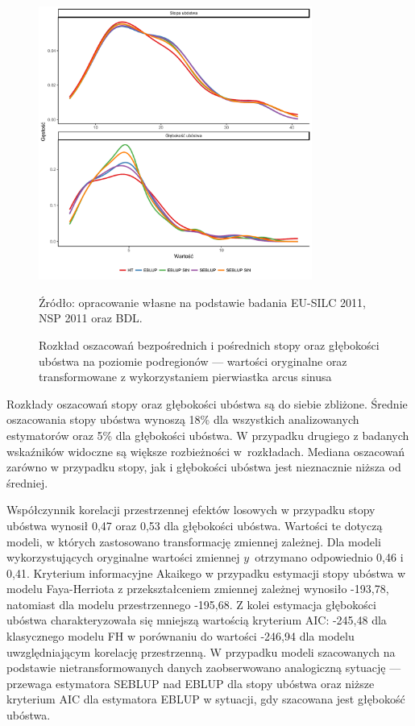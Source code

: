 \begin{figure}[htp]
\centering
\includegraphics[width=0.8\textwidth]{04_wykresy/model_podreg_oszacowania-1.pdf}
\caption{Rozkład oszacowań bezpośrednich i pośrednich stopy oraz głębokości ubóstwa na poziomie podregionów --- wartości oryginalne oraz transformowane z wykorzystaniem pierwiastka arcus sinusa}
\small{Źródło: opracowanie własne na podstawie badania EU-SILC 2011, NSP 2011 oraz BDL.}
\label{fig:podreg_oszac}
\end{figure}

Rozkłady oszacowań stopy oraz głębokości ubóstwa są do siebie zbliżone. Średnie oszacowania stopy ubóstwa wynoszą 18\% dla wszystkich analizowanych estymatorów oraz 5\% dla głębokości ubóstwa. W przypadku drugiego z badanych wskaźników widoczne są większe rozbieżności w~rozkładach. Mediana oszacowań zarówno w przypadku stopy, jak i głębokości ubóstwa jest nieznacznie niższa od średniej.

Współczynnik korelacji przestrzennej efektów losowych w przypadku stopy ubóstwa wynosił 0,47 oraz 0,53 dla głębokości ubóstwa. Wartości te dotyczą modeli, w których zastosowano transformację zmiennej zależnej. Dla modeli wykorzystujących oryginalne wartości zmiennej $y$~otrzymano odpowiednio 0,46 i 0,41. Kryterium informacyjne Akaikego w przypadku estymacji stopy ubóstwa w modelu Faya-Herriota z przekształceniem zmiennej zależnej wynosiło -193,78, natomiast dla modelu przestrzennego -195,68. Z kolei estymacja głębokości ubóstwa charakteryzowała się mniejszą wartością kryterium AIC: -245,48 dla klasycznego modelu FH w porównaniu do wartości -246,94 dla modelu uwzględniającym korelację przestrzenną. W przypadku modeli szacowanych na podstawie nietransformowanych danych zaobserwowano analogiczną sytuację --- przewaga estymatora SEBLUP nad EBLUP dla stopy ubóstwa oraz niższe kryterium AIC dla estymatora EBLUP w sytuacji, gdy szacowana jest głębokość ubóstwa.

